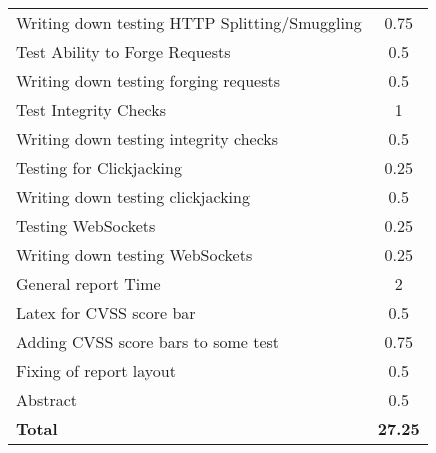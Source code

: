 \begin{table}[H]
\begin{tabular*}{\textwidth}{@{\extracolsep{\fill}} l c@{\extracolsep{0pt}} }
	Writing down testing HTTP Splitting/Smuggling & 0.75 \\
	Test Ability to Forge Requests				& 0.5 \\
	Writing down testing forging requests 		& 0.5 \\
	Test Integrity Checks						& 1 \\
	Writing down testing integrity checks 		& 0.5 \\
	Testing for Clickjacking					& 0.25 \\
	Writing down testing clickjacking 			& 0.5 \\
	Testing WebSockets							& 0.25 \\
	Writing down testing WebSockets 			& 0.25 \\
	General report Time							& 2 \\
	Latex for CVSS score bar					& 0.5 \\
	Adding CVSS score bars to some test 		& 0.75 \\
	Fixing of report layout						& 0.5 \\
	Abstract									& 0.5 \\
\hline\hline
\textbf{Total}								& \textbf{27.25}
\end{tabular*}
\end{table}
\clearpage

